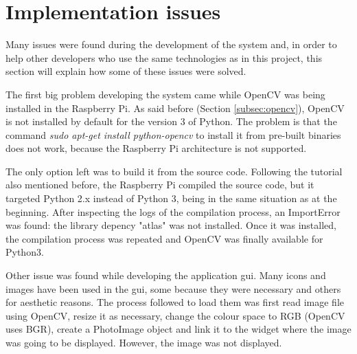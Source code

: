                                                                                                     
\section{Implementation issues}
Many issues were found during the development of the system and, in order to help other developers who use the same technologies as in this project, this section will explain how some of these issues were solved.

The first big problem developing the system came while OpenCV was being installed in the Raspberry Pi. As said before (Section \ref{subsec:opencv}), OpenCV is not installed by default for the version 3 of Python. The problem is that the command \textit{sudo apt-get install python-opencv} to install it from pre-built binaries does not work, because the Raspberry Pi architecture is not supported. 

The only option left was to build it from the source code. Following the tutorial also mentioned before, the Raspberry Pi compiled the source code, but it targeted Python 2.x instead of Python 3, being in the same situation as at the beginning. After inspecting the logs of the compilation process, an ImportError was found: the library depency "atlas" was not installed. Once it was installed, the compilation process was repeated and OpenCV was finally available for Python3.

Other issue was found while developing the application \gls{gui}. Many icons and images have been used in the \gls{gui}, some because they were necessary and others for aesthetic reasons. The process followed to load them was first read image file using OpenCV, resize it as necessary, change the colour space to RGB (OpenCV uses BGR), create a PhotoImage object and link it to the widget where the image was going to be displayed. However, the image was not displayed. 

